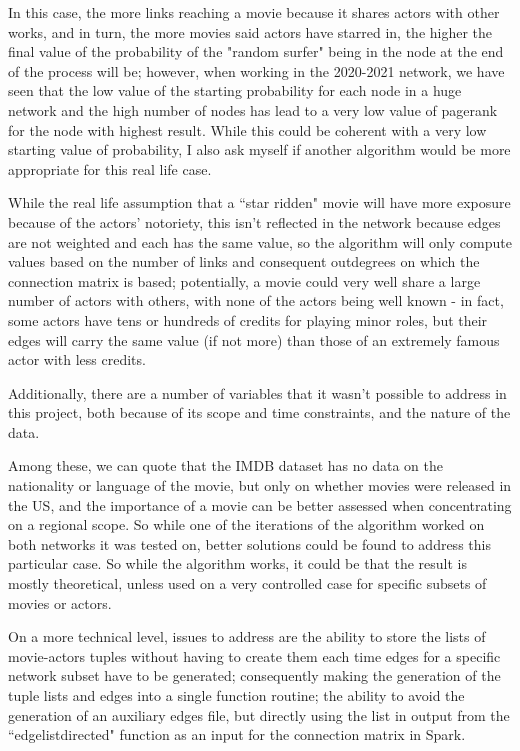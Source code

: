 \documentclass[11pt]{article}
\begin{document}
In this case, the more links reaching a movie because it shares actors with other works, and in turn, the more movies said actors have starred in, the higher the final value of the probability of the "random surfer" being in the node at the end of the process will be; however, when working in the 2020-2021 network, we have seen that the low value of the starting probability for each node in a huge network and the high number of nodes has lead to a very low value of pagerank for the node with highest result. While this could be coherent with a very low starting value of probability, I also ask myself if another algorithm would be more appropriate for this real life case. 

While the real life assumption that a ``star ridden" movie will have more exposure because of the actors' notoriety, this isn't reflected in the network because edges are not weighted and each has the same value, so the algorithm will only compute values based on the number of links and consequent outdegrees on which the connection matrix is based; potentially, a movie could very well share a large number of actors with others, with none of the actors being well known - in fact, some actors have tens or hundreds of credits for playing minor roles, but their edges will carry the same value (if not more) than those of an extremely famous actor with less credits.

Additionally, there are a number of variables that it wasn't possible to address in this project, both because of its scope and time constraints, and the nature of the data.

Among these, we can quote that the IMDB dataset has no data on the nationality or language of the movie, but only on whether movies were released in the US, and the importance of a movie can be better assessed when concentrating on a regional scope. 
So while one of the iterations of the algorithm worked on both networks it was tested on, better solutions could be found to address this particular case. So while the algorithm works, it could be that the result is mostly theoretical, unless used on a very controlled case for specific subsets of movies or actors.

On a more technical level, issues to address are the ability to store the lists of movie-actors tuples without having to create them each time edges for a specific network subset have to be generated; consequently making the generation of the tuple lists and edges into a single function routine; the ability to avoid the generation of an auxiliary edges file, but directly using the list in output from the ``edgelistdirected" function as an input for the connection matrix in Spark.\vspace{30mm}\\
\end{document}
